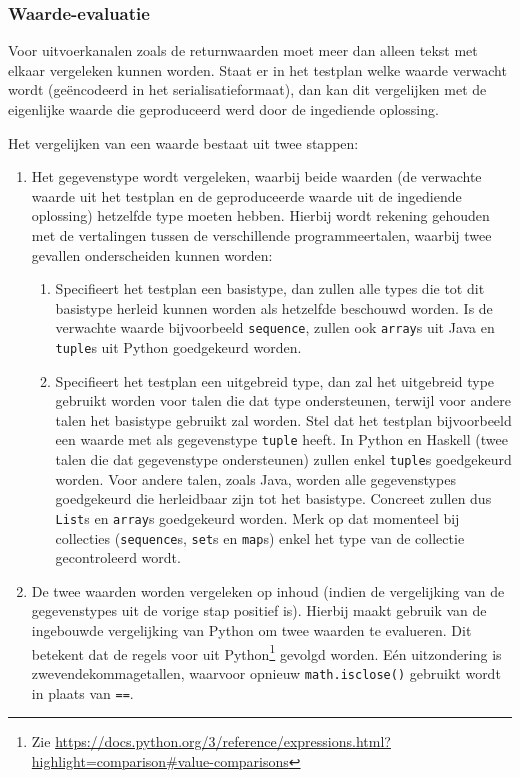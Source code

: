\subsubsection{Waarde-evaluatie}

Voor uitvoerkanalen zoals de returnwaarden moet meer dan alleen tekst met elkaar vergeleken kunnen worden.
Staat er in het testplan welke waarde verwacht wordt (geëncodeerd in het serialisatieformaat), dan kan \tested{} dit vergelijken met de eigenlijke waarde die geproduceerd werd door de ingediende oplossing.

Het vergelijken van een waarde bestaat uit twee stappen:
\begin{enumerate}
    \item Het gegevenstype wordt vergeleken, waarbij beide waarden (de verwachte waarde uit het testplan en de geproduceerde waarde uit de ingediende oplossing) hetzelfde type moeten hebben.
    Hierbij wordt rekening gehouden met de vertalingen tussen de verschillende programmeertalen, waarbij twee gevallen onderscheiden kunnen worden:
    \begin{enumerate}
        \item Specifieert het testplan een basistype, dan zullen alle types die tot dit basistype herleid kunnen worden als hetzelfde beschouwd worden.
        Is de verwachte waarde bijvoorbeeld \texttt{sequence}, zullen ook \texttt{array}s uit Java en \texttt{tuple}s uit Python goedgekeurd worden.
        \item Specifieert het testplan een uitgebreid type, dan zal het uitgebreid type gebruikt worden voor talen die dat type ondersteunen, terwijl voor andere talen het basistype gebruikt zal worden.
        Stel dat het testplan bijvoorbeeld een waarde met als gegevenstype \texttt{tuple} heeft.
        In Python en Haskell (twee talen die dat gegevenstype ondersteunen) zullen enkel \texttt{tuple}s goedgekeurd worden.
        Voor andere talen, zoals Java, worden alle gegevenstypes goedgekeurd die herleidbaar zijn tot het basistype.
        Concreet zullen dus \texttt{List}s en \texttt{array}s goedgekeurd worden.
        Merk op dat momenteel bij collecties (\texttt{sequence}s, \texttt{set}s en \texttt{map}s) enkel het type van de collectie gecontroleerd wordt.
    \end{enumerate}
    \item De twee waarden worden vergeleken op inhoud (indien de vergelijking van de gegevenstypes uit de vorige stap positief is).
    Hierbij maakt \tested{} gebruik van de ingebouwde vergelijking van Python om twee waarden te evalueren.
    Dit betekent dat de regels voor  uit Python\footnote{Zie \url{https://docs.python.org/3/reference/expressions.html?highlight=comparison\#value-comparisons}} gevolgd worden.
    Eén uitzondering is zwevendekommagetallen, waarvoor opnieuw \texttt{math.isclose()} gebruikt wordt in plaats van \texttt{==}.
\end{enumerate}

